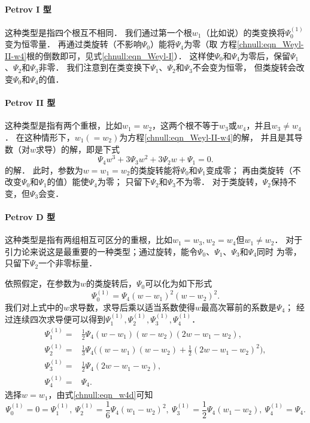 \paragraph{Petrov I 型}
这种类型是指四个根互不相同．
我们通过第一个根$w_1$（比如说）的类变换将$\Psi_0^{(1)}$变为恒零量．
再通过类旋转（不影响$\Psi_0$）能将$\Psi_4$为零（取
方程\eqref{chnull:eqn_Weyl-II-w4}根的倒数即可，见式\eqref{chnull:eqn_Weyl-I}）．
这样使$\Psi_0$和$\Psi_4$为零后，保留$\Psi_1$、$\Psi_2$和$\Psi_3$非零．
我们注意到在类变换下$\Psi_1$、$\Psi_2$和$\Psi_3$不会变为恒零，
但类旋转会改变$\Psi_0$和$\Psi_4$的值．


\paragraph{Petrov II 型}
这种类型是指有两个重根，比如$w_1=w_2$，这两个根不等于$w_3$或$w_4$，并且$w_3\neq w_4$．
在这种情形下，$w_1(=w_2)$为方程\eqref{chnull:eqn_Weyl-II-w4}的解，
并且是其导数（对$w$求导）的解，即是下式
\begin{equation}\label{chnull:eqn_Weyl-II-w4-d1}
    \Psi_{4} w^3 +  3 \Psi_{3}  w^2 + 3  \Psi_{2} w +  \Psi_{1} = 0 .
\end{equation}
的解．
此时，参数为$w=w_1=w_2$的类旋转能将$\Psi_0$和$\Psi_1$变成零；
再由类旋转（不改变$\Psi_0$和$\Psi_1$的值）能使$\Psi_4$为零；
只留下$\Psi_2$和$\Psi_3$不为零．
对于类旋转，$\Psi_2$保持不变，但$\Psi_3$会变．

\paragraph{Petrov D 型}
这种类型是指有两组相互可区分的重根，比如$w_1=w_3, w_2 = w_4$但$w_1\neq w_2$．
对于引力论来说这是最重要的一种类型；通过旋转，能令$\Psi_0$、$\Psi_1$、$\Psi_3$和$\Psi_4$同时
为零，只留下$\Psi_2$一个非零标量．


依照假定，在参数为$w$的类旋转后，$\Psi_0$可以化为如下形式
\begin{equation}
    \Psi_0^{(1)} = \Psi_4 (w-w_1)^2 (w-w_2)^2.
\end{equation}
我们对上式中的$w$求导数，求导后乘以适当系数使得$w$最高次幂前的系数是$\Psi_4$；
经过连续四次求导便可以得到$\Psi_1^{(1)},\Psi_2^{(1)},\Psi_3^{(1)},\Psi_4^{(1)}$．
\begin{subequations}\label{chnull:eqn_w4d}
    \begin{align}
        \Psi_1^{(1)} =& \frac{1}{2}\Psi_4 (w-w_1)(w-w_2)(2w-w_1-w_2) ,\\
        \Psi_2^{(1)} =& \frac{1}{3}\Psi_4 \bigl((w-w_1)(w-w_2)+\frac{1}{2}(2w-w_1-w_2)^2\bigr), \\
        \Psi_3^{(1)} =& \frac{1}{2}\Psi_4 (2w-w_1-w_2) , \\
        \Psi_4^{(1)} =& \Psi_4 .
    \end{align}
\end{subequations}
选择$w=w_1$，由式\eqref{chnull:eqn_w4d}可知
\begin{equation*}
    \Psi_0^{(1)}=0=\Psi_1^{(1)},\
    \Psi_2^{(1)}=\frac{1}{6}\Psi_4 (w_1-w_2)^2, \
    \Psi_3^{(1)}=\frac{1}{2}\Psi_4 (w_1-w_2),\
    \Psi_4^{(1)} = \Psi_4 .
\end{equation*}

